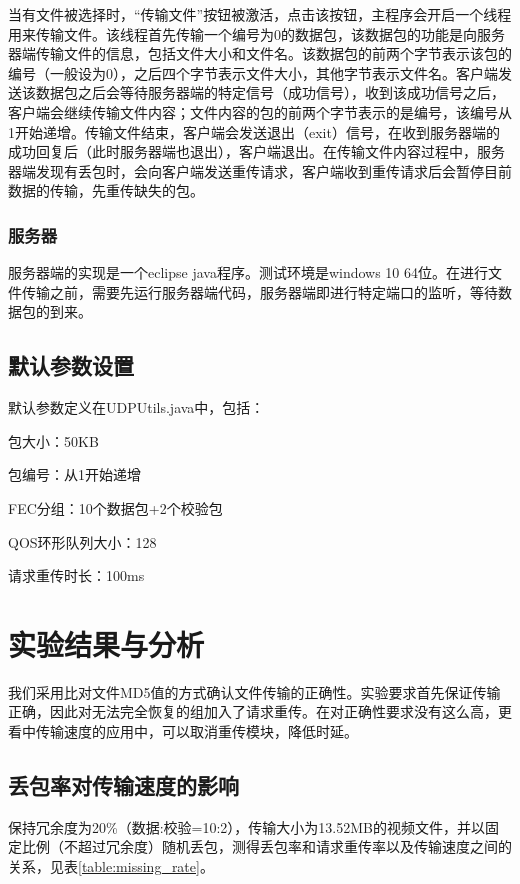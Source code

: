 \documentclass[onecolumn]{article}
\begin{document}
\begin{CJK*}{UTF8}{gbsn}
		当有文件被选择时，“传输文件”按钮被激活，点击该按钮，主程序会开启一个线程用来传输文件。该线程首先传输一个编号为0的数据包，该数据包的功能是向服务器端传输文件的信息，包括文件大小和文件名。该数据包的前两个字节表示该包的编号（一般设为0），之后四个字节表示文件大小，其他字节表示文件名。客户端发送该数据包之后会等待服务器端的特定信号（成功信号），收到该成功信号之后，客户端会继续传输文件内容；文件内容的包的前两个字节表示的是编号，该编号从1开始递增。传输文件结束，客户端会发送退出（exit）信号，在收到服务器端的成功回复后（此时服务器端也退出），客户端退出。在传输文件内容过程中，服务器端发现有丢包时，会向客户端发送重传请求，客户端收到重传请求后会暂停目前数据的传输，先重传缺失的包。
		
		\subsubsection{服务器}
		服务器端的实现是一个eclipse java程序。测试环境是windows 10 64位。在进行文件传输之前，需要先运行服务器端代码，服务器端即进行特定端口的监听，等待数据包的到来。 

		\subsection{默认参数设置}
		默认参数定义在UDPUtils.java中，包括：
		
		包大小：50KB
		
		包编号：从1开始递增
		
		FEC分组：10个数据包+2个校验包
		
		QOS环形队列大小：128
		
		请求重传时长：100ms
		
\section{实验结果与分析}
		我们采用比对文件MD5值的方式确认文件传输的正确性。实验要求首先保证传输正确，因此对无法完全恢复的组加入了请求重传。在对正确性要求没有这么高，更看中传输速度的应用中，可以取消重传模块，降低时延。
		
		\subsection{丢包率对传输速度的影响}
		保持冗余度为20\%（数据:校验=10:2），传输大小为13.52MB的视频文件，并以固定比例（不超过冗余度）随机丢包，测得丢包率和请求重传率以及传输速度之间的关系，见表\ref{table:missing_rate}。
		

\end{CJK*}
\end{document}

